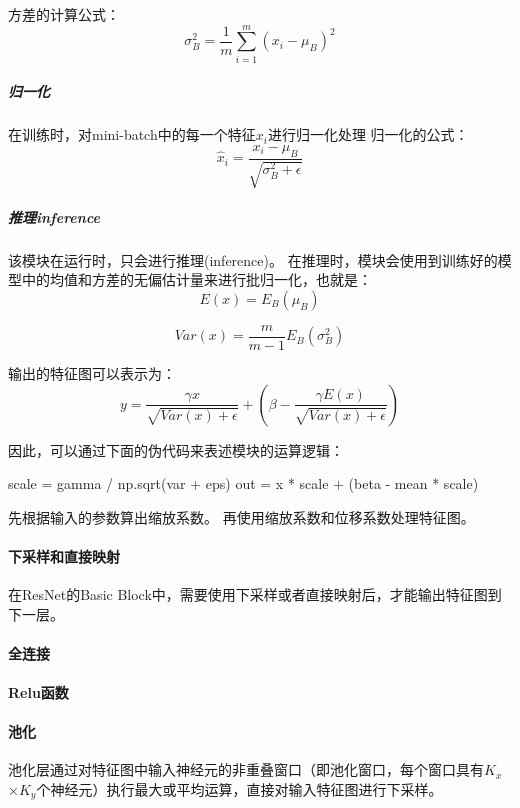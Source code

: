 方差的计算公式：
$$ \sigma_{B}^{2} = \frac{1}{m} \sum_{i=1}^{m}(x_{i} - \mu_{B})^2  $$

\subparagraph{归一化}
在训练时，对mini-batch中的每一个特征$x_i$进行归一化处理
归一化的公式：
$$
        \hat{x}_{i} = \frac{ x_{i} - \mu_{B} }{ \sqrt{\sigma_{B}^{2}+\epsilon}}
$$

\subparagraph{推理inference}
该模块在运行时，只会进行推理(inference)。
在推理时，模块会使用到训练好的模型中的均值和方差的无偏估计量来进行批归一化，也就是：
$$ E(x) = E_{B}(\mu_{B}) $$    

$$ Var(x) = \frac{m}{m-1}E_{B}(\sigma_{B}^{2})  $$    

输出的特征图可以表示为：
$$ y = \frac{\gamma x}{\sqrt{Var(x) + \epsilon}} + ( \beta - \frac{\gamma E(x)}{\sqrt{Var(x) + \epsilon}} )  $$

因此，可以通过下面的伪代码来表述模块的运算逻辑：
\begin{codeblock}[language=python]
    scale = gamma / np.sqrt(var + eps)
    out = x * scale + (beta - mean * scale)
\end{codeblock}
先根据输入的参数算出缩放系数。
再使用缩放系数和位移系数处理特征图。

\paragraph{下采样和直接映射}
在ResNet的Basic Block中，需要使用下采样或者直接映射后，才能输出特征图到下一层。

\paragraph{全连接}

\paragraph{Relu函数}

\paragraph{池化}
池化层通过对特征图中输入神经元的非重叠窗口（即池化窗口，每个窗口具有$K_x$×$K_y$个神经元）执行最大或平均运算，直接对输入特征图进行下采样。



